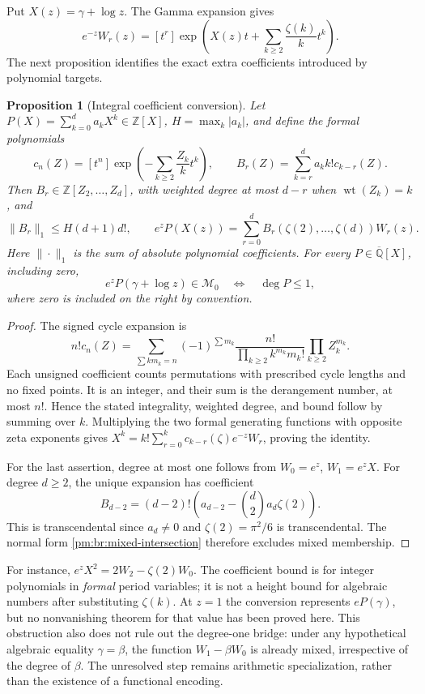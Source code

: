 \documentclass[11pt,a4paper]{article}
\newtheorem{proposition}[theorem]{Proposition}
\theoremstyle{definition}
\theoremstyle{remark}
\numberwithin{equation}{section}
\begin{document}
Put \(X(z)=\gamma+\log z\).  The Gamma expansion gives
\[
 e^{-z}W_r(z)=[t^r]\exp\left(X(z)t+
                           \sum_{k\geq2}\frac{\zeta(k)}k t^k\right).
\]
The next proposition identifies the exact extra coefficients introduced
by polynomial targets.

\begin{proposition}[Integral coefficient conversion]
\label{pm:br:polynomial-conversion}
Let \(P(X)=\sum_{k=0}^d a_kX^k\in\mathbb Z[X]\),
\(H=\max_k|a_k|\), and define the formal polynomials
\[
 c_n(Z)=[t^n]\exp\left(-\sum_{k\geq2}\frac{Z_k}k t^k\right),
 \qquad B_r(Z)=\sum_{k=r}^d a_k k!c_{k-r}(Z).
\]
Then \(B_r\in\mathbb Z[Z_2,\ldots,Z_d]\), with weighted degree at
most \(d-r\) when \(\operatorname{wt}(Z_k)=k\), and
\[
 \|B_r\|_1\leq H(d+1)d!,\qquad
 e^zP(X(z))=\sum_{r=0}^d B_r(\zeta(2),\ldots,\zeta(d))W_r(z).
\]
Here \(\|\cdot\|_1\) is the sum of absolute polynomial coefficients.
For every \(P\in\overline{\mathbb Q}[X]\), including zero,
\begin{equation}\label{pm:br:degree-obstruction}
 e^zP(\gamma+\log z)\in\mathcal M_0
                  \quad\Longleftrightarrow\quad \deg P\leq1,
\end{equation}
where zero is included on the right by convention.
\end{proposition}

\begin{proof}
The signed cycle expansion is
\[
 n!c_n(Z)=
 \sum_{\sum k m_k=n}(-1)^{\sum m_k}
       \frac{n!}{\prod_{k\geq2}k^{m_k}m_k!}
                          \prod_{k\geq2}Z_k^{m_k}.
\]
Each unsigned coefficient counts permutations with prescribed cycle
lengths and no fixed points.  It is an integer, and their sum is the
derangement number, at most \(n!\).  Hence the stated integrality,
weighted degree, and bound follow by summing over \(k\).
Multiplying the two formal generating functions with opposite zeta
exponents gives
\(X^k=k!\sum_{r=0}^k c_{k-r}(\zeta)e^{-z}W_r\), proving the identity.

For the last assertion, degree at most one follows from
\(W_0=e^z\), \(W_1=e^zX\).  For degree \(d\geq2\), the unique
expansion has coefficient
\[
 B_{d-2}=(d-2)!\left(a_{d-2}-\binom d2 a_d\zeta(2)\right).
\]
This is transcendental since \(a_d\ne0\) and
\(\zeta(2)=\pi^2/6\) is transcendental.  The normal form
\eqref{pm:br:mixed-intersection} therefore excludes mixed membership.
\end{proof}

For instance, \(e^zX^2=2W_2-\zeta(2)W_0\).
The coefficient bound is for integer polynomials in \emph{formal}
period variables; it is not a height bound for algebraic numbers after
substituting \(\zeta(k)\).  At \(z=1\) the conversion represents
\(eP(\gamma)\), but no nonvanishing theorem for that value has been
proved here.  This obstruction also does not rule out the degree-one
bridge: under any hypothetical algebraic equality \(\gamma=\beta\),
the function \(W_1-\beta W_0\) is already mixed, irrespective of the
degree of \(\beta\).  The unresolved step remains arithmetic
specialization, rather than the existence of a functional encoding.
\end{document}
